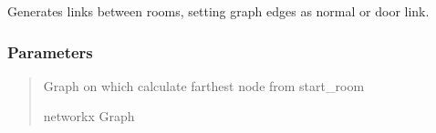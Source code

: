 \documentclass[letterpaper,10pt,english]{sphinxmanual}
\begin{document}
\begin{fulllineitems}
\label{\detokenize{api_reference/dungeon_resolver/generate_dungeon_problem:generate_dungeon_problem.generate_doors}}
\pysigstartsignatures
{}
\pysigstopsignatures
\sphinxAtStartPar
Generates links between rooms, setting graph edges as normal or door link.


\subsubsection{Parameters}
\label{\detokenize{api_reference/dungeon_resolver/generate_dungeon_problem:id1}}\begin{quote}\begin{description}
\sphinxAtStartPar
Graph on which calculate farthest node from start\_room

\sphinxAtStartPar
networkx Graph

\end{description}\end{quote}

\end{fulllineitems}

\end{document}

